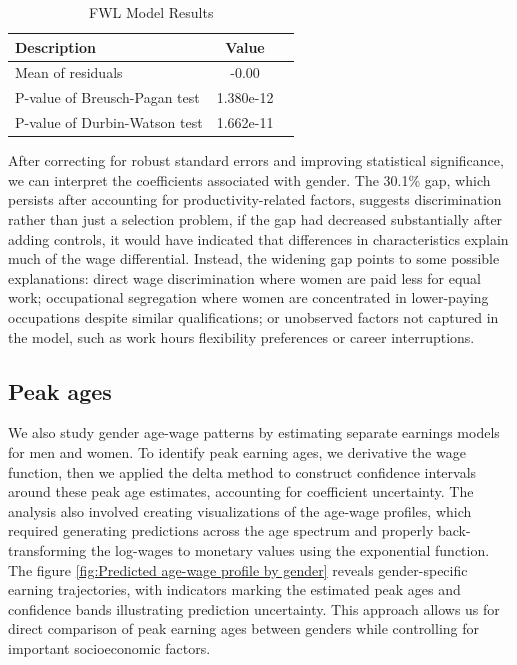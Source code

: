 \documentclass[a4paper,12pt]{article}
\begin{document}
\begin{table}[H]
\caption{FWL Model Results} 
\label{tab:fwl_model_results}
\centering
\vspace{0.5cm} %
\begin{tabular}{lcc}
    \textbf{Description} & \textbf{Value} \\ 
    \hline \hline
    Mean of residuals & -0.00 \\ 
    P-value of Breusch-Pagan test & 1.380e-12 \\ 
    P-value of Durbin-Watson test & 1.662e-11 \\ 
    \hline
\end{tabular}
\end{table}

After correcting for robust standard errors and improving statistical significance, we can interpret the coefficients associated with gender. The 30.1\% gap, which persists after accounting for productivity-related factors, suggests discrimination rather than just a selection problem, if the gap had decreased substantially after adding controls, it would have indicated that differences in characteristics explain much of the wage differential. Instead, the widening gap points to some possible explanations: direct wage discrimination where women are paid less for equal work; occupational segregation where women are concentrated in lower-paying occupations despite similar qualifications; or unobserved factors not captured in the model, such as work hours flexibility preferences or career interruptions.


\subsection{ Peak ages}

We also study gender age-wage patterns by estimating separate earnings models for men and women. To identify peak earning ages, we derivative the wage function, then we applied the delta method to construct confidence intervals around these peak age estimates, accounting for coefficient uncertainty.
The analysis also involved creating visualizations of the age-wage profiles, which required generating predictions across the age spectrum and properly back-transforming the log-wages to monetary values using the exponential function. \\

The figure \ref{fig:Predicted age-wage profile by gender} reveals gender-specific earning trajectories, with indicators marking the estimated peak ages and confidence bands illustrating prediction uncertainty. This approach allows us for direct comparison of peak earning ages between genders while controlling for important socioeconomic factors.
\end{document}
